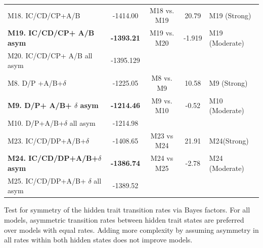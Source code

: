 \begin{supptable}
\begin{tabular}{|l|c|c|c|l|}
M18. IC/CD/CP+A/B                            & -1414.00                     &     M18 vs. M19                & 20.79                   & M19 (Strong)    \\
\textbf{M19. IC/CD/CP+ A/B asym}       & \textbf{-1393.21}            & M19 vs. M20          & {-1.919}         & M19 (Moderate)   \\
M20. IC/CD/CP+ A/B all asym           & -1395.129                    &                     &                         &                         \\ \hline
M8. D/P +A/B+$\delta$                          & -1225.05                     &  M8 vs. M9                   & 10.58                   & M9 (Strong)    \\
\textbf{M9. D/P+ A/B+ $\delta$ asym}      & \textbf{-1214.46}                     &    M9 vs. M10                 & -0.52                   & M10 (Moderate) \\
M10. D/P+A/B+$\delta$ all asym        & -1214.98                     &                    &                         &                         \\ \hline
M23. IC/CD/DP+A/B+$\delta$                 & -1408.65                     &     M23 vs M24                & 21.91                   & M24(Strong)     \\
\textbf{M24. IC/CD/DP+A/B+$\delta$ asym} & \textbf{-1386.74}                     &   M24 vs M25              & -2.78                   & M24 (Moderate) \\
M25. IC/CD/DP+A/B+ $\delta$ all asym     & -1389.52                     &                     &                         &                         \\ \hline
\end{tabular}
\caption{Test for symmetry of the hidden trait transition rates via Bayes factors. For all models, asymmetric transition rates between hidden trait states are preferred over models with equal rates. Adding more complexity by assuming asymmetry in all rates within both hidden states does not improve models.} %
\label{supptable:asymmetry}
\end{supptable}


